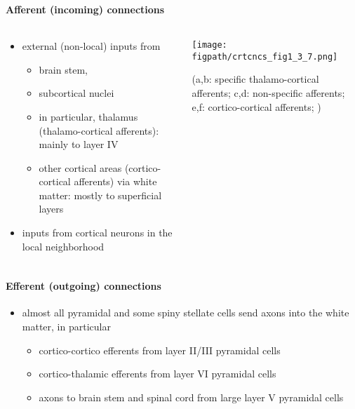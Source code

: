 \documentclass[8pt,t,usepdftitle=false]{beamer}
\def\figpath{\src/figures}
\begin{document}
\begin{frame}[t,plain]
  \frametitle{\ttl}
  \framesubtitle{Afferent (incoming) connections}
  \begin{columns}
    \begin{column}{0.5\linewidth}
      \begin{itemize}\itemsep1ex
      \item external (non-local) inputs from
        \begin{itemize}\itemsep1ex
        \item brain stem,
        \item subcortical nuclei
        \item in particular, thalamus (thalamo-cortical afferents):
          mainly to layer IV
        \item other cortical areas (cortico-cortical afferents)
          via white matter:
          mostly to superficial layers
        \end{itemize}
      \item inputs from cortical neurons in the local neighborhood
      \end{itemize}
    \end{column}
    \begin{column}{0.5\linewidth}
      \begin{center}
        \vspace*{-1cm}
      \parbox{\linewidth}{
        \texttt{[image: \\figpath/crtcncs\_fig1\_3\_7.png]}\\
        \parbox{\linewidth}{\tiny\color{gray}(a,b: specific thalamo-cortical afferents;
          c,d: non-specific afferents;
          e,f: cortico-cortical afferents; \cite{Abeles91})
        }        
      }        
      \end{center}
    \end{column}
  \end{columns}
\end{frame}
\begin{frame}[plain]
  \frametitle{\ttl}
  \framesubtitle{Efferent (outgoing) connections}
  \begin{itemize}\itemsep1ex
  \item almost all pyramidal and some spiny stellate cells send axons 
    into the white matter, in particular
    \begin{itemize}\itemsep1ex
    \item cortico-cortico efferents from layer II/III pyramidal cells
    \item cortico-thalamic efferents from layer VI pyramidal cells
    \item axons to brain stem and spinal cord from large layer V pyramidal cells
    \end{itemize}
  \end{itemize}  
\end{frame}
\end{document}
